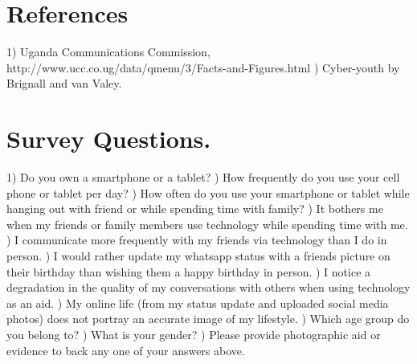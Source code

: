 \documentclass[11pt]{article} %
\begin{document}
\section{References }
1) Uganda Communications Commission,
http://www.ucc.co.ug/data/qmenu/3/Facts-and-Figures.html
) Cyber-youth by Brignall and van Valey.

\section{Survey Questions.}
1) Do you own a smartphone or a tablet?
) How frequently do you use your cell phone or tablet per day?
) How often do you use your smartphone or tablet while hanging out with friend or while spending time with family?
) It bothers me when my friends or family members use technology while spending time with me.
) I communicate more frequently with my friends via technology than I do in person.
) I would rather update my whatsapp status with a friends picture on their birthday than wishing them a happy birthday in person.
) I notice a degradation in the quality of my conversations with others when using technology as an aid.
) My online  life (from my status update and uploaded social media photos) does not portray an accurate image of my lifestyle.
) Which age group do you belong to?
) What is your gender?
) Please provide photographic aid or evidence to back any one of your answers above.
\end{document}
